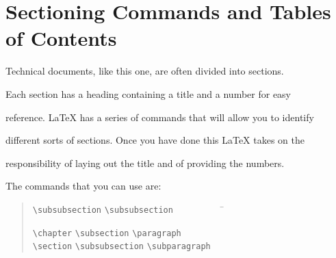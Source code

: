 \section{Sectioning Commands and Tables of Contents}



Technical documents, like this one, are often divided into sections.

Each section has a heading containing a title and a number for easy

reference.  \LaTeX{} has a series of commands that will allow you to identify

different sorts of sections.  Once you have done this \LaTeX{} takes on the

responsibility of laying out the title and of providing the numbers.



The commands that you can use are:

\begin{quote}\begin{tabbing}

\verb|\subsubsection| \= \verb|\subsubsection|~~~~~~~~~~ \=           \kill

\verb|\chapter|       \> \verb|\subsection|    \> \verb|\paragraph|    \\

\verb|\section|       \> \verb|\subsubsection| \> \verb|\subparagraph| \\

\end{tabbing}\end{quote}

